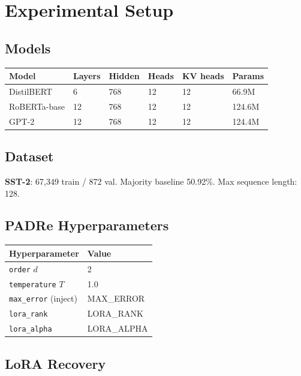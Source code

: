 \section{Experimental Setup}

\subsection{Models}

\begin{table}[H]
\centering
\small
\begin{tabular}{llllll}
\toprule
\textbf{Model} & \textbf{Layers} & \textbf{Hidden} & \textbf{Heads} & \textbf{KV heads} & \textbf{Params} \\
\midrule
DistilBERT & 6 & 768 & 12 & 12 & 66.9M \\
RoBERTa-base & 12 & 768 & 12 & 12 & 124.6M \\
GPT-2 & 12 & 768 & 12 & 12 & 124.4M \\
\bottomrule
\end{tabular}
\end{table}

\subsection{Dataset}

\textbf{SST-2}: 67,349 train / 872 val. Majority baseline 50.92\%. 
Max sequence length: 128.

\subsection{PADRe Hyperparameters}

\begin{table}[H]
\centering
\small
\begin{tabular}{ll}
\toprule
\textbf{Hyperparameter} & \textbf{Value} \\
\midrule
\texttt{order} $d$ & 2 \\
\texttt{temperature} $T$ & 1.0 \\
\texttt{max\_error} (inject) & {{MAX\_ERROR}} \\
\texttt{lora\_rank} & {{LORA\_RANK}} \\
\texttt{lora\_alpha} & {{LORA\_ALPHA}} \\
\bottomrule
\end{tabular}
\end{table}

\subsection{LoRA Recovery}


